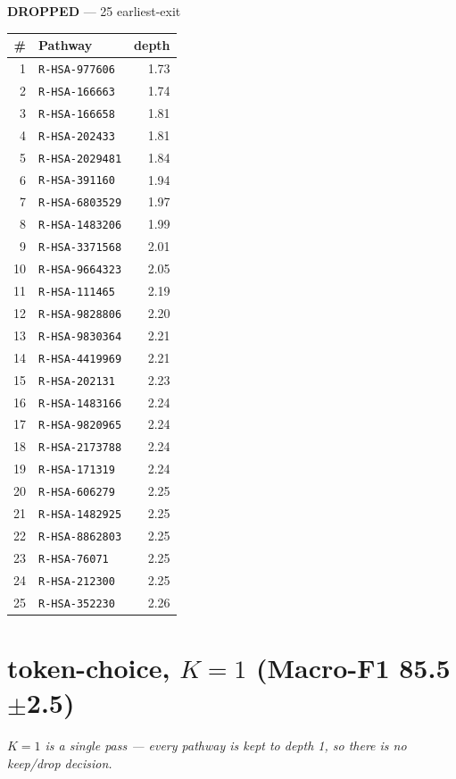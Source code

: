 \documentclass[10pt]{article}
\begin{document}
\begin{minipage}[t]{0.48\textwidth}\centering\textbf{\color{red!60!black}DROPPED} --- 25 earliest-exit\\[3pt]
\begin{tabular}{@{}r l r@{}}
\toprule
\# & Pathway & depth \\
\midrule
1 & \texttt{R-HSA-977606} & 1.73 \\
2 & \texttt{R-HSA-166663} & 1.74 \\
3 & \texttt{R-HSA-166658} & 1.81 \\
4 & \texttt{R-HSA-202433} & 1.81 \\
5 & \texttt{R-HSA-2029481} & 1.84 \\
6 & \texttt{R-HSA-391160} & 1.94 \\
7 & \texttt{R-HSA-6803529} & 1.97 \\
8 & \texttt{R-HSA-1483206} & 1.99 \\
9 & \texttt{R-HSA-3371568} & 2.01 \\
10 & \texttt{R-HSA-9664323} & 2.05 \\
11 & \texttt{R-HSA-111465} & 2.19 \\
12 & \texttt{R-HSA-9828806} & 2.20 \\
13 & \texttt{R-HSA-9830364} & 2.21 \\
14 & \texttt{R-HSA-4419969} & 2.21 \\
15 & \texttt{R-HSA-202131} & 2.23 \\
16 & \texttt{R-HSA-1483166} & 2.24 \\
17 & \texttt{R-HSA-9820965} & 2.24 \\
18 & \texttt{R-HSA-2173788} & 2.24 \\
19 & \texttt{R-HSA-171319} & 2.24 \\
20 & \texttt{R-HSA-606279} & 2.25 \\
21 & \texttt{R-HSA-1482925} & 2.25 \\
22 & \texttt{R-HSA-8862803} & 2.25 \\
23 & \texttt{R-HSA-76071} & 2.25 \\
24 & \texttt{R-HSA-212300} & 2.25 \\
25 & \texttt{R-HSA-352230} & 2.26 \\
\bottomrule
\end{tabular}
\end{minipage}
\section*{token-choice, $K=1$  (Macro-F1 85.5$\pm$2.5)}
\emph{$K{=}1$ is a single pass --- every pathway is kept to depth 1, so there is no keep/drop decision.}
\end{document}
